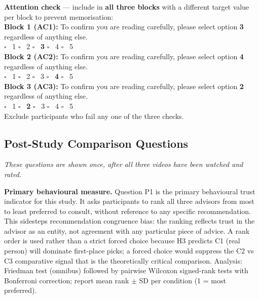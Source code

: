 \documentclass[11pt, a4paper]{article}
\begin{document}
\begin{warnbox}
\small\textbf{Attention check} --- include in \textbf{all three blocks} with a different target value per block to prevent memorisation:\\[6pt]
\textbf{Block 1 (AC1):} To confirm you are reading carefully, please select option \textbf{3} regardless of anything else.\\[3pt]
$\square$ \ 1 \quad $\square$ \ 2 \quad $\square$ \ \textbf{3} \quad $\square$ \ 4 \quad $\square$ \ 5\\[8pt]
\textbf{Block 2 (AC2):} To confirm you are reading carefully, please select option \textbf{4} regardless of anything else.\\[3pt]
$\square$ \ 1 \quad $\square$ \ 2 \quad $\square$ \ 3 \quad $\square$ \ \textbf{4} \quad $\square$ \ 5\\[8pt]
\textbf{Block 3 (AC3):} To confirm you are reading carefully, please select option \textbf{2} regardless of anything else.\\[3pt]
$\square$ \ 1 \quad $\square$ \ \textbf{2} \quad $\square$ \ 3 \quad $\square$ \ 4 \quad $\square$ \ 5\\[4pt]
\noindent\small Exclude participants who fail any one of the three checks.
\end{warnbox}

\vspace{10pt}

\newpage

\subsection{Post-Study Comparison Questions}
\label{sec:postcomp}

\noindent\textit{These questions are shown once, after all three videos have been watched and rated.}

\begin{infobox}
\small\textbf{Primary behavioural measure.} Question P1 is the primary behavioural trust indicator for this study. It asks participants to rank all three advisors from most to least preferred to consult, without reference to any specific recommendation. This sidesteps recommendation congruence bias: the ranking reflects trust in the advisor as an entity, not agreement with any particular piece of advice. A rank order is used rather than a strict forced choice because H3 predicts C1 (real person) will dominate first-place picks; a forced choice would suppress the C2 vs C3 comparative signal that is the theoretically critical comparison. Analysis: Friedman test (omnibus) followed by pairwise Wilcoxon signed-rank tests with Bonferroni correction; report mean rank $\pm$ SD per condition (1 = most preferred).
\end{infobox}
\end{document}
